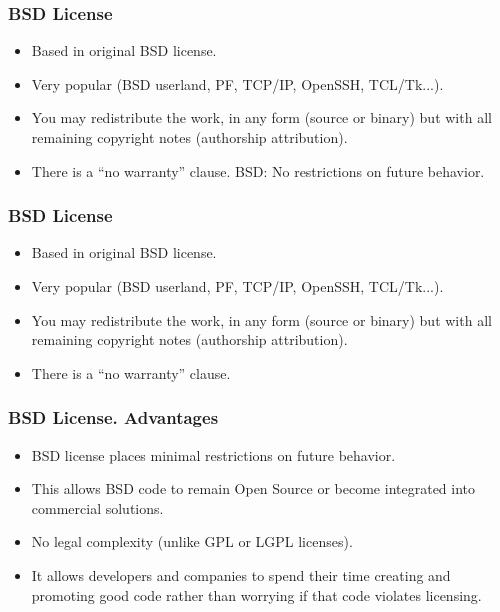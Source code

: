 
\begin{frame}
\frametitle{BSD License}

\begin{itemize}
\item Based in original BSD license.
\item Very popular (BSD userland, PF, TCP/IP, OpenSSH, TCL/Tk...).
\item You may redistribute the work, in any form (source or binary)
  but with all remaining copyright notes (authorship attribution).
\item There is a ``no warranty'' clause. 
BSD: No restrictions on future behavior. 
\end{itemize}

\end{frame}


\begin{frame}
\frametitle{BSD License}

\begin{itemize}
\item Based in original BSD license.
\item Very popular (BSD userland, PF, TCP/IP, OpenSSH, TCL/Tk...).
\item You may redistribute the work, in any form (source or binary)
  but with all remaining copyright notes (authorship attribution).
\item There is a ``no warranty'' clause. 
\end{itemize}

\end{frame}


\begin{frame}
\frametitle{BSD License. Advantages}

\begin{itemize}
\item BSD license places minimal restrictions on future behavior.
\item This allows BSD code to remain Open Source or become integrated into commercial solutions.
\item No legal complexity (unlike GPL or LGPL licenses). 
\item It allows developers and companies to spend their time creating and promoting good code rather than worrying if that code violates licensing.
\end{itemize}

\end{frame}


